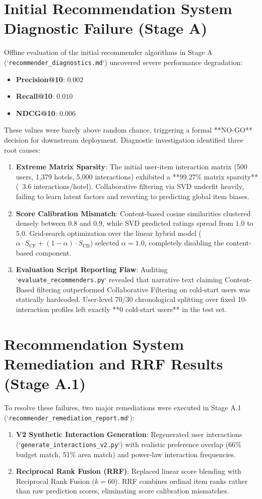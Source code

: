 \section{Initial Recommendation System Diagnostic Failure (Stage A)}
Offline evaluation of the initial recommender algorithms in Stage A (`\texttt{recommender\_diagnostics.md}`) uncovered severe performance degradation:
\begin{itemize}
    \item \textbf{Precision@10}: $0.002$
    \item \textbf{Recall@10}: $0.010$
    \item \textbf{NDCG@10}: $0.006$
\end{itemize}

These values were barely above random chance, triggering a formal **NO-GO** decision for downstream deployment. Diagnostic investigation identified three root causes:
\begin{enumerate}
    \item \textbf{Extreme Matrix Sparsity}: The initial user-item interaction matrix (500 users, 1,379 hotels, 5,000 interactions) exhibited a **99.27\% matrix sparsity** (~3.6 interactions/hotel). Collaborative filtering via SVD underfit heavily, failing to learn latent factors and reverting to predicting global item biases.
    \item \textbf{Score Calibration Mismatch}: Content-based cosine similarities clustered densely between $0.8$ and $0.9$, while SVD predicted ratings spread from $1.0$ to $5.0$. Grid-search optimization over the linear hybrid model ($\alpha \cdot S_{\text{CF}} + (1-\alpha) \cdot S_{\text{CB}}$) selected $\alpha = 1.0$, completely disabling the content-based component.
    \item \textbf{Evaluation Script Reporting Flaw}: Auditing `\texttt{evaluate\_recommenders.py}` revealed that narrative text claiming Content-Based filtering outperformed Collaborative Filtering on cold-start users was statically hardcoded. User-level 70/30 chronological splitting over fixed 10-interaction profiles left exactly **0 cold-start users** in the test set.
\end{enumerate}

\section{Recommendation System Remediation and RRF Results (Stage A.1)}
To resolve these failures, two major remediations were executed in Stage A.1 (`\texttt{recommender\_remediation_report.md}`):
\begin{enumerate}
    \item \textbf{V2 Synthetic Interaction Generation}: Regenerated user interactions (`\texttt{generate\_interactions\_v2.py}`) with realistic preference overlap (66\% budget match, 51\% area match) and power-law interaction frequencies.
    \item \textbf{Reciprocal Rank Fusion (RRF)}: Replaced linear score blending with Reciprocal Rank Fusion ($k=60$). RRF combines ordinal item ranks rather than raw prediction scores, eliminating score calibration mismatches.
\end{enumerate}

